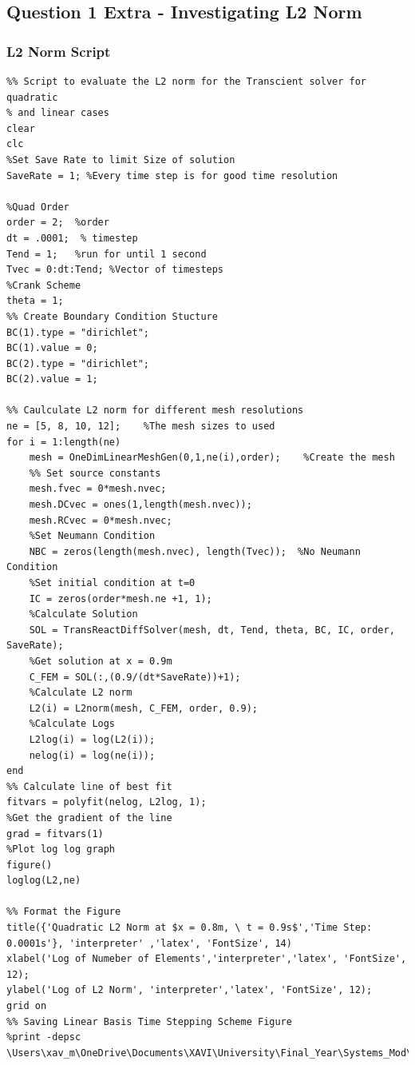 \documentclass[11pt]{article}
\begin{document}
\begin{appendices}
\subsection{Question 1 Extra - Investigating L2 Norm}\label{ap:L2}


\subsubsection{L2 Norm Script}\label{ap:L2Script}

\begin{lstlisting}
%% Script to evaluate the L2 norm for the Transcient solver for quadratic
% and linear cases
clear
clc
%Set Save Rate to limit Size of solution
SaveRate = 1; %Every time step is for good time resolution

%Quad Order
order = 2;  %order
dt = .0001;  % timestep
Tend = 1;   %run for until 1 second
Tvec = 0:dt:Tend; %Vector of timesteps
%Crank Scheme
theta = 1;
%% Create Boundary Condition Stucture
BC(1).type = "dirichlet";
BC(1).value = 0;
BC(2).type = "dirichlet";
BC(2).value = 1;

%% Caulculate L2 norm for different mesh resolutions
ne = [5, 8, 10, 12];    %The mesh sizes to used
for i = 1:length(ne)
    mesh = OneDimLinearMeshGen(0,1,ne(i),order);    %Create the mesh
    %% Set source constants
    mesh.fvec = 0*mesh.nvec;
    mesh.DCvec = ones(1,length(mesh.nvec));
    mesh.RCvec = 0*mesh.nvec;
    %Set Neumann Condition
    NBC = zeros(length(mesh.nvec), length(Tvec));  %No Neumann Condition
    %Set initial condition at t=0
    IC = zeros(order*mesh.ne +1, 1);
    %Calculate Solution
    SOL = TransReactDiffSolver(mesh, dt, Tend, theta, BC, IC, order, SaveRate);
    %Get solution at x = 0.9m
    C_FEM = SOL(:,(0.9/(dt*SaveRate))+1);
    %Calculate L2 norm
    L2(i) = L2norm(mesh, C_FEM, order, 0.9);
    %Calculate Logs
    L2log(i) = log(L2(i));
    nelog(i) = log(ne(i));
end
%% Calculate line of best fit
fitvars = polyfit(nelog, L2log, 1);
%Get the gradient of the line
grad = fitvars(1)
%Plot log log graph
figure()
loglog(L2,ne)

%% Format the Figure
title({'Quadratic L2 Norm at $x = 0.8m, \ t = 0.9s$','Time Step: 0.0001s'}, 'interpreter' ,'latex', 'FontSize', 14)
xlabel('Log of Numeber of Elements','interpreter','latex', 'FontSize', 12);
ylabel('Log of L2 Norm', 'interpreter','latex', 'FontSize', 12);
grid on
%% Saving Linear Basis Time Stepping Scheme Figure
%print -depsc \Users\xav_m\OneDrive\Documents\XAVI\University\Final_Year\Systems_Mod\Modeling_CW2\Report\Figures\epsQ1L2O2


\end{lstlisting}
\end{appendices}
\end{document}
